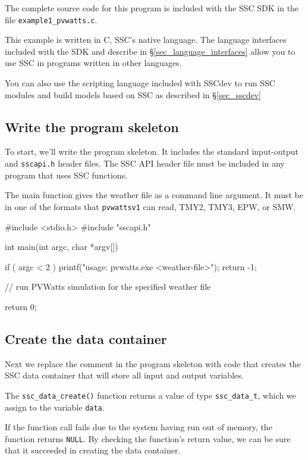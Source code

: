 \documentclass{article}
\begin{document}
The complete source code for this program is included with the SSC SDK in the file \texttt{example1\_pvwatts.c}.

This example is written in C, SSC's native language. The language interfaces included with the SDK and describe in \S\ref{sec_language_interfaces} allow you to use SSC in programs written in other languages.

You can also use the scripting language included with SSCdev to run SSC modules and build models based on SSC as described in \S\ref{sec_sscdev}

\subsection{Write the program skeleton}

To start, we'll write the program skeleton. It includes the standard input-output and  \texttt{sscapi.h} header files. The SSC API header file must be included in any program that uses SSC functions.

The main function gives the weather file as a command line argument. It must be in one of the formats that \texttt{pvwattsv1} can read,  TMY2, TMY3, EPW, or SMW.

\begin{verbatimtab}[4]
#include <stdio.h>
#include "sscapi.h"

int main(int argc, char *argv[])
{
	if ( argc < 2 )
	{
		printf("usage: pvwatts.exe <weather-file>\n");
		return -1;
	}
 
	// run PVWatts simulation for the specified weather file
	
	return 0;
}
\end{verbatimtab}

\subsection{Create the data container}

Next we replace the comment in the program skeleton with code that creates the SSC data container that will store all input and output variables.
 
The \texttt{ssc\_data\_create()} function returns a value of type \texttt{ssc\_data\_t}, which we assign to the variable \texttt{data}.

If the function call fails due to the system having run out of memory, the function returns \texttt{NULL}. By checking the function's return value, we can be sure that it succeeded in creating the data container.
\end{document}
